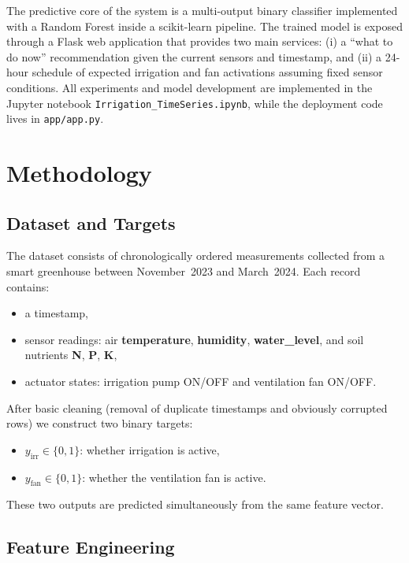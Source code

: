 \documentclass[sn-mathphys,Numbered]{sn-jnl}
\begin{document}
The predictive core of the system is a multi-output binary classifier implemented with a Random Forest inside a scikit-learn pipeline.  
The trained model is exposed through a Flask web application that provides two main services: (i) a ``what to do now'' recommendation given the current sensors and timestamp, and (ii) a 24-hour schedule of expected irrigation and fan activations assuming fixed sensor conditions.  
All experiments and model development are implemented in the Jupyter notebook \texttt{Irrigation\_TimeSeries.ipynb}, while the deployment code lives in \texttt{app/app.py}.

\section{Methodology}\label{sec:methodology}

\subsection{Dataset and Targets}

The dataset consists of chronologically ordered measurements collected from a smart greenhouse between November~2023 and March~2024.  
Each record contains:
\begin{itemize}
    \item a timestamp,
    \item sensor readings: air \textbf{temperature}, \textbf{humidity}, \textbf{water\_level}, and soil nutrients \textbf{N}, \textbf{P}, \textbf{K},
    \item actuator states: irrigation pump ON/OFF and ventilation fan ON/OFF.
\end{itemize}
After basic cleaning (removal of duplicate timestamps and obviously corrupted rows) we construct two binary targets:
\begin{itemize}
    \item $y_{\text{irr}} \in \{0,1\}$: whether irrigation is active,
    \item $y_{\text{fan}} \in \{0,1\}$: whether the ventilation fan is active.
\end{itemize}
These two outputs are predicted simultaneously from the same feature vector.

\subsection{Feature Engineering}
\end{document}
